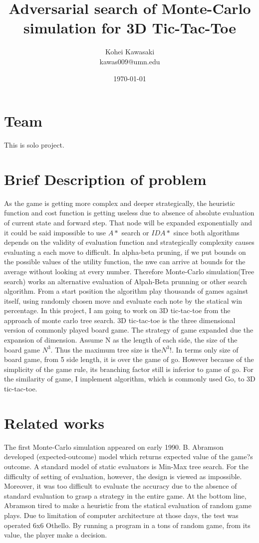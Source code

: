 \documentclass[11pt]{article}
\title{Adversarial search of Monte-Carlo simulation for 3D Tic-Tac-Toe}
\author{
Kohei Kawasaki\\kawas009@umn.edu
}
\date{\today}
\begin{document}
\maketitle

\section{Team}
This is solo project. 
\label{sec:rw}
\section{Brief Description of problem}
As the game is getting more complex and deeper strategically, the heuristic function and cost function is getting useless due to absence of absolute evaluation of current state and forward step. That node will be expanded exponentially and it could be said impossible to use \(A*\) search or \(IDA*\) since both algorithms depends on the validity of evaluation function and strategically complexity causes evaluating a each move to difficult. In alpha-beta pruning, if we put bounds on the possible values of the utility function, the nwe can arrive at bounds for the average without looking at every number.
Therefore Monte-Carlo simulation(Tree search) works an alternative evaluation of Alpah-Beta prunning or other search algorithm. From a start position the algorithm play thousands of games against itself, using randomly chosen move and evaluate each note by the statical win percentage. In this project, I am going to work on 3D tic-tac-toe from the approach of monte carlo tree search. 3D tic-tac-toe is the three dimensional version of commonly played board game. The strategy of game expanded due the expansion of dimension. Assume N as the length of each side, the size of the board game \(N^3\). Thus the maximum tree size is the\(N^3!\). In terms only size of board game, from 5 side length, it is over the game of go. However because of the simplicity of the game rule, its branching factor still is inferior to game of go. For the similarity of game, I implement algorithm, which is commonly used Go, to 3D tic-tac-toe.

\section{Related works}
The first Monte-Carlo simulation appeared on early 1990. B. Abramson developed (expected-outcome) model which returns expected value of the game?s outcome\cite{abramson1990expected}. A standard model of static evaluators is Min-Max tree search. For the difficulty of setting of evaluation, however, the design is viewed as impossible. Moreover, it was too difficult to evaluate the accuracy due to the absence of standard evaluation to grasp a strategy in the entire game.  At the bottom line, Abramson tired to make a heuristic from the statical evaluation of random game plays. Due to limitation of computer architecture at those days, the test was operated 6x6 Othello. By running a program in a tons of random game, from its value, the player make a decision. 
\end{document}
